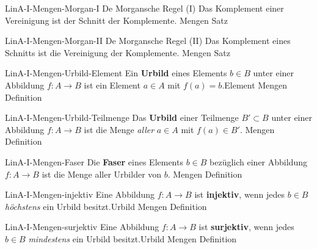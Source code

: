 \documentclass[10pt]{article}
\begin{document}
\begin{note}{LinA-I-Mengen-Morgan-I}
\field De Morgansche Regel (I)
\field
  Das Komplement einer Vereinigung ist der Schnitt der Komplemente.\clend
\field
\field Mengen
\field Satz
\end{note}
 
\begin{note}{LinA-I-Mengen-Morgan-II}
\field De Morgansche Regel (II)
\field
    Das Komplement eines Schnitts ist die Vereinigung der Komplemente.\clend
\field  
\field Mengen
\field Satz
\end{note}
 
\begin{note}{LinA-I-Mengen-Urbild-Element}
\field
\field
  Ein \textbf{Urbild} eines Elements \(b\in B\) unter einer Abbildung \(f\colon A\to B\) ist ein Element \(a\in A\) mit \(f(a) = b\).\hint Element\clend
\field
\field Mengen
\field Definition
\end{note}
 
 
\begin{note}{LinA-I-Mengen-Urbild-Teilmenge}
\field
\field Das \textbf{Urbild} einer Teilmenge \(B'\subset B\) unter einer Abbildung \(f\colon A\to B\) ist die Menge \emph{aller} \(a\in A\) mit \(f(a) \in B'\).\clend
\field
\field Mengen
\field Definition
\end{note}
 
\begin{note}{LinA-I-Mengen-Faser}
\field
\field Die \textbf{Faser} eines Elements \(b\in B\) bezüglich einer Abbildung \(f\colon A\to B\) ist die Menge aller Urbilder von \(b\).\clend
\field
\field Mengen
\field Definition
\end{note}

\begin{note}{LinA-I-Mengen-injektiv}
  \field
  \field
  Eine Abbildung \(f\colon A\to B\) ist \textbf{injektiv}, wenn jedes \(b\in B\) \emph{höchstens} ein Urbild besitzt.\hint Urbild\clend
  \field
  \field Mengen
  \field Definition
\end{note}

\begin{note}{LinA-I-Mengen-surjektiv}
  \field
  \field
  Eine Abbildung \(f\colon A\to B\) ist \textbf{surjektiv}, wenn jedes \(b\in B\) \emph{mindestens} ein Urbild besitzt.\hint Urbild\clend
  \field
  \field Mengen
  \field Definition
\end{note}
\end{document}
